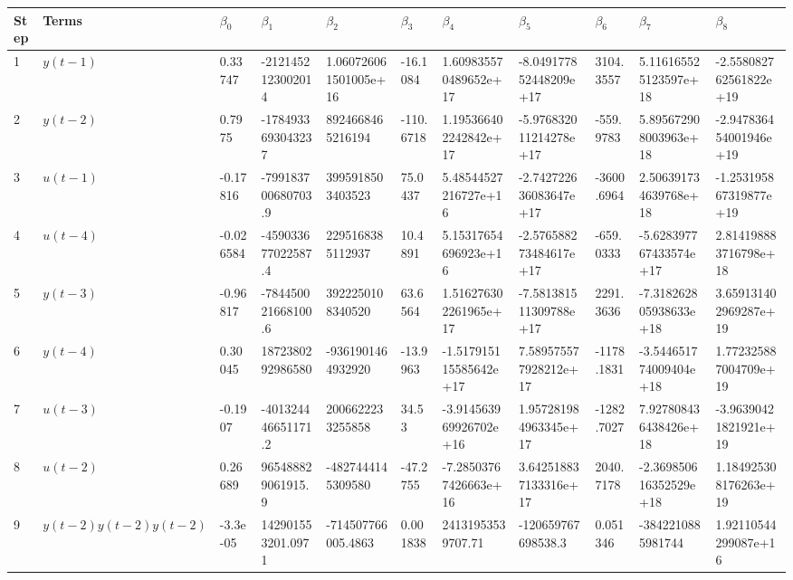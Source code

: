 \begin{tabular}{lllllllllll}
Step & Terms & $\beta_{0}$ & $\beta_{1}$ & $\beta_{2}$ & $\beta_{3}$ & $\beta_{4}$ & $\beta_{5}$ & $\beta_{6}$ & $\beta_{7}$ & $\beta_{8}$ \\ 
\hline 
1 & $y(t-1)$ & 0.33747 & -2121452123002014 & 1.060726061501005e+16 & -16.1084 & 1.609835570489652e+17 & -8.049177852448209e+17 & 3104.3557 & 5.116165525123597e+18 & -2.558082762561822e+19 \\ 
2 & $y(t-2)$ & 0.7975 & -1784933693043237 & 8924668465216194 & -110.6718 & 1.195366402242842e+17 & -5.976832011214278e+17 & -559.9783 & 5.895672908003963e+18 & -2.947836454001946e+19 \\ 
3 & $u(t-1)$ & -0.17816 & -799183700680703.9 & 3995918503403523 & 75.0437 & 5.48544527216727e+16 & -2.742722636083647e+17 & -3600.6964 & 2.506391734639768e+18 & -1.253195867319877e+19 \\ 
4 & $u(t-4)$ & -0.026584 & -459033677022587.4 & 2295168385112937 & 10.4891 & 5.15317654696923e+16 & -2.576588273484617e+17 & -659.0333 & -5.628397767433574e+17 & 2.814198883716798e+18 \\ 
5 & $y(t-3)$ & -0.96817 & -784450021668100.6 & 3922250108340520 & 63.6564 & 1.516276302261965e+17 & -7.581381511309788e+17 & 2291.3636 & -7.318262805938633e+18 & 3.659131402969287e+19 \\ 
6 & $y(t-4)$ & 0.30045 & 1872380292986580 & -9361901464932920 & -13.9963 & -1.517915115585642e+17 & 7.589575577928212e+17 & -1178.1831 & -3.544651774009404e+18 & 1.772325887004709e+19 \\ 
7 & $u(t-3)$ & -0.1907 & -401324446651171.2 & 2006622233255858 & 34.53 & -3.914563969926702e+16 & 1.957281984963345e+17 & -1282.7027 & 7.927808436438426e+18 & -3.96390421821921e+19 \\ 
8 & $u(t-2)$ & 0.26689 & 965488829061915.9 & -4827444145309580 & -47.2755 & -7.28503767426663e+16 & 3.642518837133316e+17 & 2040.7178 & -2.369850616352529e+18 & 1.184925308176263e+19 \\ 
9 & $y(t-2)y(t-2)y(t-2)$ & -3.3e-05 & 142901553201.0971 & -714507766005.4863 & 0.001838 & 24131953539707.71 & -120659767698538.3 & 0.051346 & -3842210885981744 & 1.92110544299087e+16 \\ 
\hline 
\end{tabular}